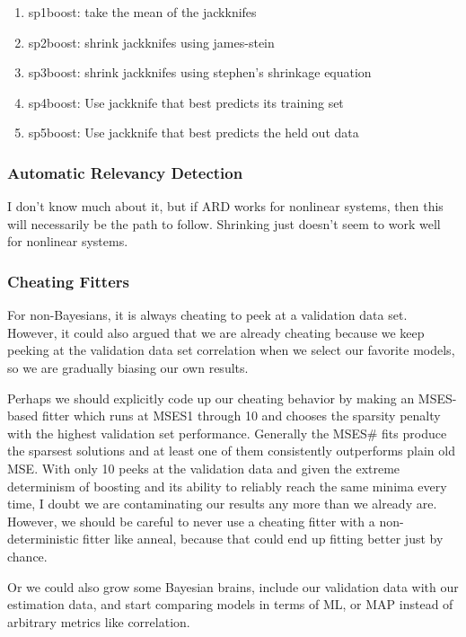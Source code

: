 \documentclass[11pt]{article}
\begin{document}
\begin{enumerate}
\item sp1boost: take the mean of the jackknifes
\item sp2boost: shrink jackknifes using james-stein
\item sp3boost: shrink jackknifes using stephen's shrinkage equation
\item sp4boost: Use jackknife that best predicts its training set
\item sp5boost: Use jackknife that best predicts the held out data
\end{enumerate}
    
\subsubsection{Automatic Relevancy Detection}
\label{sec-2.8.10}


    I don't know much about it, but if ARD works for nonlinear systems, then this will necessarily be the path to follow. Shrinking just doesn't seem to work well for nonlinear systems.

\subsubsection{Cheating Fitters}
\label{sec-2.8.11}


    For non-Bayesians, it is always cheating to peek at a validation data set. However, it could also argued that we are already cheating because we keep peeking at the validation data set correlation when we select our favorite models, so we are gradually biasing our own results. 

    Perhaps we should explicitly code up our cheating behavior by making an MSES-based fitter which runs at MSES1 through 10 and chooses the sparsity penalty with the highest validation set performance. Generally the MSES\# fits produce the sparsest solutions and at least one of them consistently outperforms plain old MSE. With only 10 peeks at the validation data and given the extreme determinism of boosting and its ability to reliably reach the same minima every time, I doubt we are contaminating our results any more than we already are. However, we should be careful to never use a cheating fitter with a non-deterministic fitter like anneal, because that could end up fitting better just by chance.

    Or we could also grow some Bayesian brains, include our validation data with our estimation data, and start comparing models in terms of ML, or MAP instead of arbitrary metrics like correlation.
\end{document}
